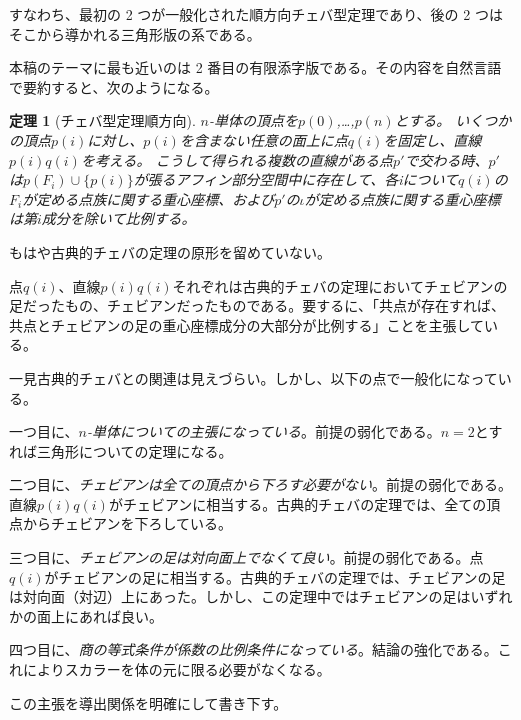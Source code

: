 \documentclass[a4paper,12pt]{bxjsbook}
\newlength{\customindent}
\newenvironment{body}{
  \par
  \begingroup
  \setlength{\leftskip}{\customindent}
  \setlength{\rightskip}{0pt}
  \setlength{\parindent}{1em}
  \setlength{\displayindent}{\customindent}
  \setlength{\displaywidth}{\dimexpr\linewidth-\customindent\relax}
}{
  \par
  \endgroup
}
\theoremstyle{theorem}
\newtheorem{theorem}{定理}[chapter]
\begin{document}
    \begin{body}
        \indent すなわち、最初の 2 つが一般化された順方向チェバ型定理であり、後の 2 つはそこから導かれる三角形版の系である。

        \indent 本稿のテーマに最も近いのは 2 番目の有限添字版である。その内容を自然言語で要約すると、次のようになる。
    \end{body}

    \begin{theorem}[チェバ型定理順方向]
        $n$-単体の頂点を$p(0)$,…,$p(n)$とする。
        いくつかの頂点$p(i)$に対し、$p(i)$を含まない任意の面上に点$q(i)$を固定し、直線$p(i)q(i)$を考える。
        こうして得られる複数の直線がある点$p'$で交わる時、$p'$は$p(F_i)\cup \{p(i)\}$が張るアフィン部分空間中に存在して、各iについて$q(i)$の$F_i$が定める点族に関する重心座標、および$p'$の$\iota$が定める点族に関する重心座標は第$i$成分を除いて比例する。
    \end{theorem}

    \begin{body}
        \indent もはや古典的チェバの定理の原形を留めていない。

        \indent 点$q(i)$、直線$p(i)q(i)$それぞれは古典的チェバの定理においてチェビアンの足だったもの、チェビアンだったものである。要するに、「共点が存在すれば、共点とチェビアンの足の重心座標成分の大部分が比例する」ことを主張している。

        \indent 一見古典的チェバとの関連は見えづらい。しかし、以下の点で一般化になっている。

        \indent 一つ目に、\emph{$n$-単体についての主張になっている}。前提の弱化である。$n=2$とすれば三角形についての定理になる。

        \indent 二つ目に、\emph{チェビアンは全ての頂点から下ろす必要がない}。前提の弱化である。直線$p(i)q(i)$がチェビアンに相当する。古典的チェバの定理では、全ての頂点からチェビアンを下ろしている。

        \indent 三つ目に、\emph{チェビアンの足は対向面上でなくて良い}。前提の弱化である。点$q(i)$がチェビアンの足に相当する。古典的チェバの定理では、チェビアンの足は対向面（対辺）上にあった。しかし、この定理中ではチェビアンの足はいずれかの面上にあれば良い。

        \indent 四つ目に、\emph{商の等式条件が係数の比例条件になっている}。結論の強化である。これによりスカラーを体の元に限る必要がなくなる。

        \indent この主張を導出関係を明確にして書き下す。

    \end{body}
\end{document}
